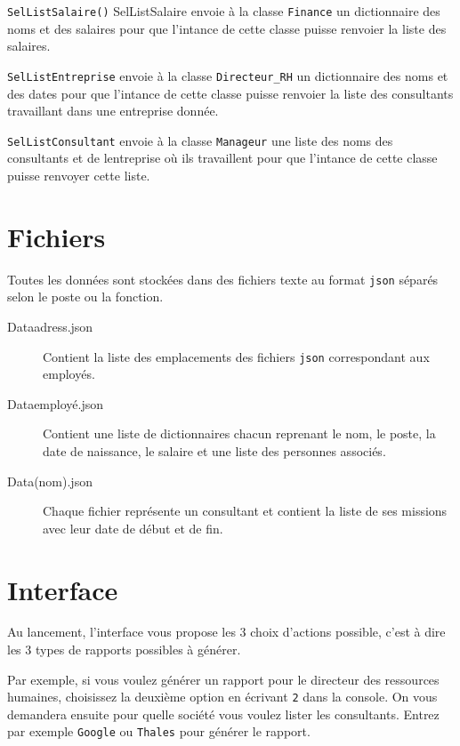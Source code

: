 \documentclass[a4paper, 11pt]{article}
\begin{document}
\texttt{SelListSalaire()} SelListSalaire envoie à la classe \texttt{Finance} un dictionnaire des noms et des salaires pour que l'intance de cette classe puisse renvoier la liste des salaires.

\texttt{SelListEntreprise} envoie à la classe \verb|Directeur_RH| un dictionnaire des noms et des dates pour que l'intance de cette classe puisse renvoier la liste des consultants travaillant dans une entreprise donnée.

\texttt{SelListConsultant} envoie à la classe \texttt{Manageur} une liste des noms des consultants et de lentreprise où ils travaillent pour que l'intance de cette classe puisse renvoyer cette liste.

\section{Fichiers}
Toutes les données sont stockées dans des fichiers texte au format \texttt{json} séparés selon le poste ou la fonction.

\begin{description}
  \item[Dataadress.json] Contient la liste des emplacements des fichiers \texttt{json} correspondant aux employés.
  \item[Dataemployé.json] Contient une liste de dictionnaires chacun reprenant le nom, le poste, la date de naissance, le salaire et une liste des personnes associés.
  \item[Data(nom).json] Chaque fichier représente un consultant et contient la liste de ses missions avec leur date de début et de fin.
\end{description}

\section{Interface}
Au lancement, l'interface vous propose les 3 choix d'actions possible, c'est à dire les 3 types de rapports possibles à générer.

Par exemple, si vous voulez générer un rapport pour le directeur des ressources humaines, choisissez la deuxième option en écrivant \texttt{2} dans la console. On vous demandera ensuite pour quelle société vous voulez lister les consultants. Entrez par exemple \texttt{Google} ou \texttt{Thales} pour générer le rapport.
\end{document}
